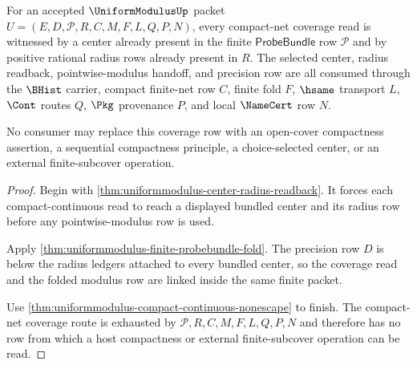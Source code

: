 \begin{theorem}
\label{thm:uniformmodulus-compact-net-coverage-obligation}
For an accepted $\UniformModulusUp$ packet $U=(E,D,\mathcal{P},R,C,M,F,L,Q,P,N)$, every compact-net coverage read is witnessed by a center already present in the finite $\mathsf{ProbeBundle}$ row $\mathcal{P}$ and by positive rational radius rows already present in $R$. The selected center, radius readback, pointwise-modulus handoff, and precision row are all consumed through the $\BHist$ carrier, compact finite-net row $C$, finite fold $F$, $\hsame$ transport $L$, $\Cont$ routes $Q$, $\Pkg$ provenance $P$, and local $\NameCert$ row $N$.

No consumer may replace this coverage row with an open-cover compactness assertion, a sequential compactness principle, a choice-selected center, or an external finite-subcover operation.
\end{theorem}
\begin{proof}
Begin with \autoref{thm:uniformmodulus-center-radius-readback}. It forces each compact-continuous read to reach a displayed bundled center and its radius row before any pointwise-modulus row is used.

Apply \autoref{thm:uniformmodulus-finite-probebundle-fold}. The precision row $D$ is below the radius ledgers attached to every bundled center, so the coverage read and the folded modulus row are linked inside the same finite packet.

Use \autoref{thm:uniformmodulus-compact-continuous-nonescape} to finish. The compact-net coverage route is exhausted by $\mathcal{P},R,C,M,F,L,Q,P,N$ and therefore has no row from which a host compactness or external finite-subcover operation can be read.
\end{proof}


